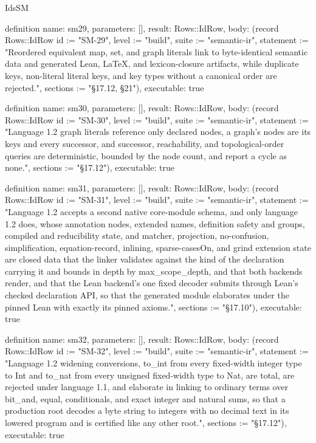 \begin{lexlean}{IdsSM}
\begin{semanticmodule}
definition{
  name: sm29,
  parameters: [],
  result: Rows::IdRow,
  body: (record Rows::IdRow {id := "SM-29", level := "build", suite := "semantic-ir", statement := "Reordered equivalent map, set, and graph literals link to byte-identical semantic data and generated Lean, LaTeX, and lexicon-closure artifacts, while duplicate keys, non-literal literal keys, and key types without a canonical order are rejected.", sections := "§17.12, §21"}),
  executable: true
}

definition{
  name: sm30,
  parameters: [],
  result: Rows::IdRow,
  body: (record Rows::IdRow {id := "SM-30", level := "build", suite := "semantic-ir", statement := "Language 1.2 graph literals reference only declared nodes, a graph's nodes are its keys and every successor, and successor, reachability, and topological-order queries are deterministic, bounded by the node count, and report a cycle as none.", sections := "§17.12"}),
  executable: true
}

definition{
  name: sm31,
  parameters: [],
  result: Rows::IdRow,
  body: (record Rows::IdRow {id := "SM-31", level := "build", suite := "semantic-ir", statement := "Language 1.2 accepts a second native core-module schema, and only language 1.2 does, whose annotation nodes, extended names, definition safety and groups, compiled and reducibility state, and matcher, projection, no-confusion, simplification, equation-record, inlining, sparse-casesOn, and grind extension state are closed data that the linker validates against the kind of the declaration carrying it and bounds in depth by max_scope_depth, and that both backends render, and that the Lean backend's one fixed decoder submits through Lean's checked declaration API, so that the generated module elaborates under the pinned Lean with exactly its pinned axioms.", sections := "§17.10"}),
  executable: true
}

definition{
  name: sm32,
  parameters: [],
  result: Rows::IdRow,
  body: (record Rows::IdRow {id := "SM-32", level := "build", suite := "semantic-ir", statement := "Language 1.2 widening conversions, to_int from every fixed-width integer type to Int and to_nat from every unsigned fixed-width type to Nat, are total, are rejected under language 1.1, and elaborate in linking to ordinary terms over bit_and, equal, conditionals, and exact integer and natural sums, so that a production root decodes a byte string to integers with no decimal text in its lowered program and is certified like any other root.", sections := "§17.12"}),
  executable: true
}


\end{semanticmodule}
\end{lexlean}
